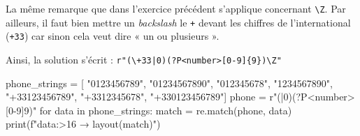 \begin{solution}
La même remarque que dans l'exercice précédent s'applique concernant \lstinline[basicstyle={\shellttfont}]{\Z}. 
Par ailleurs, il faut bien mettre un \textit{backslash} le \texttt{+} devant les chiffres de l'international (\texttt{+33}) car sinon cela veut dire « un ou plusieurs ».

Ainsi, la solution s'écrit : \texttt{r"(\textbackslash{+}33|0)(?P<number>[0-9]\{9\})\textbackslash{Z}"}

\begin{idleconsole}
	\begin{pyconsole}
phone_strings = [
    "0123456789",
    "01234567890",
    "012345678",
    "1234567890",
    "+33123456789",
    "+3312345678",
    "+330123456789"]
phone = r"(|0)(?P<number>[0-9]{9})\Z"
for data in phone_strings:
    match = re.match(phone, data)
    print(f"{data:>16} → {layout(match)}")

	\end{pyconsole}
\end{idleconsole}

\end{solution}


